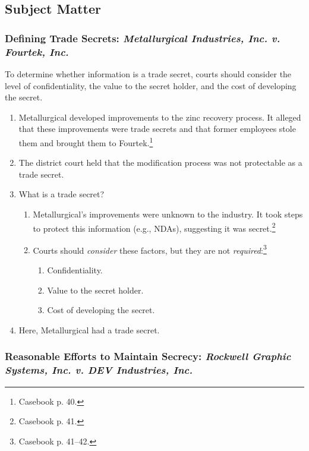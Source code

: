 \subsection{Subject Matter}

\subsubsection{Defining Trade Secrets: \emph{Metallurgical Industries, Inc. v. 
Fourtek, Inc.}}

To determine whether information is a trade secret, courts should consider the 
level of confidentiality, the value to the secret holder, and the cost of 
developing the secret.

\begin{enumerate}
    \item Metallurgical developed improvements to the zinc recovery process. 
    It alleged that these improvements were trade secrets and that former 
    employees stole them and brought them to Fourtek.\footnote{Casebook p. 40.}
    \item The district court held that the modification process was not 
    protectable as a trade secret.
    \item What is a trade secret?
    \begin{enumerate}
        \item Metallurgical's improvements were unknown to the industry. It 
        took steps to protect this information (e.g., NDAs), suggesting it was 
        secret.\footnote{Casebook p. 41.}
        \item Courts should \emph{consider} these factors, but they are not 
        \emph{required}:\footnote{Casebook p. 41--42.}
        \begin{enumerate}
            \item Confidentiality.
            \item Value to the secret holder.
            \item Cost of developing the secret.
        \end{enumerate}
    \end{enumerate}
    \item Here, Metallurgical had a trade secret.
\end{enumerate}

\subsubsection{Reasonable Efforts to Maintain Secrecy: \emph{Rockwell Graphic 
Systems, Inc. v. DEV Industries, Inc.}}

